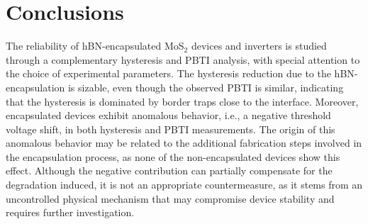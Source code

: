 \documentclass[conference]{IEEEtran}
\begin{document}
\section{Conclusions}\label{sec:conclusions}
The reliability of hBN-encapsulated MoS$_2$ devices and inverters is studied through a complementary hysteresis and PBTI analysis, with special attention to the choice of experimental parameters. The hysteresis reduction due to the hBN-encapsulation is sizable, even though the observed PBTI is similar, indicating that the hysteresis is dominated by border traps close to the interface. Moreover, encapsulated devices exhibit anomalous behavior, i.e., a negative threshold voltage shift,  in both hysteresis and PBTI measurements. The origin of this anomalous behavior may be related to the additional fabrication steps involved in the encapsulation process, as none of the non-encapsulated devices show this effect. Although the negative contribution can partially compensate for the degradation induced, it is not an appropriate countermeasure, as it stems from an uncontrolled physical mechanism that may compromise device stability and requires further investigation.

\printbibliography

\end{document}
